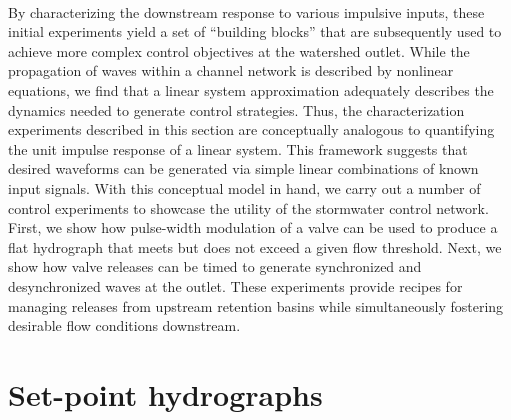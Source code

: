 \

By characterizing the downstream response to various impulsive inputs, these initial experiments yield a set of ``building blocks” that are subsequently used to achieve more complex control objectives at the watershed outlet.
While the propagation of waves within a channel network is described by nonlinear equations, we find that a linear system approximation adequately describes the dynamics needed to generate control strategies. %
Thus, the characterization experiments described in this section are conceptually analogous to quantifying the unit impulse response of a linear system. This framework suggests that desired waveforms can be generated via simple linear combinations of known input signals.
With this conceptual model in hand, we carry out a number of control experiments to showcase the utility of the stormwater control network. First, we show how pulse-width modulation of a valve can be used to produce a flat hydrograph that meets but does not exceed a given flow threshold. Next, we show how valve releases can be timed to generate synchronized and desynchronized waves at the outlet. These experiments provide recipes for managing releases from upstream retention basins while simultaneously fostering desirable flow conditions downstream.

\section{Set-point hydrographs}

